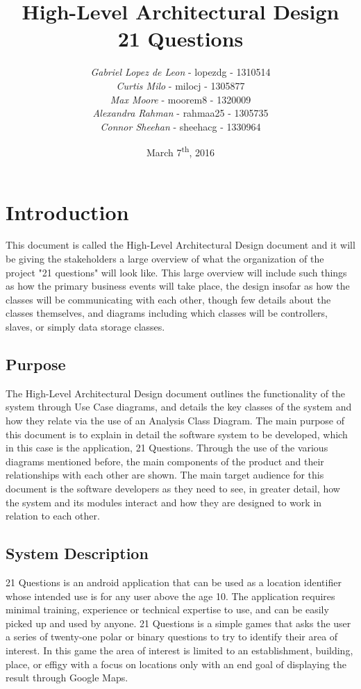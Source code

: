 \documentclass[titlepage]{article}
\title{\Huge{\textbf{High-Level Architectural Design\\21 Questions}}\vspace{9cm}}
\author{\textit{Gabriel Lopez de Leon} - lopezdg - 1310514\\\textit{Curtis Milo} - milocj - 1305877\\\textit{Max Moore} - moorem8 - 1320009\\\textit{Alexandra Rahman} - rahmaa25 - 1305735\\\textit{Connor Sheehan} - sheehacg - 1330964}
\date{March 7\textsuperscript{th}, 2016}
\begin{document}
\maketitle	

\tableofcontents
\newpage

\section{Introduction}
\label{sec:introduction}

This document is called the High-Level Architectural Design document and it will be giving the stakeholders a large overview of what the organization of the project "21 questions" will look like.  This large overview will include such things as how  the primary business events will take place, the design insofar as how the classes will be communicating with each other, though few details about the classes themselves, and diagrams including which classes will be controllers, slaves, or simply data storage classes.

\subsection{Purpose}
\label{sub:purpose}
The High-Level Architectural Design document outlines the functionality of the system through Use Case diagrams, and details the key classes of the system and how they relate via the use of an Analysis Class Diagram. The main purpose of this document is to explain in detail the software system to be developed, which in this case is the application, 21 Questions. Through the use of the various diagrams mentioned before, the main components of the product and their relationships with each other are shown. The main target audience for this document is the software developers as they need to see, in greater detail, how the system and its modules interact and how they are designed to work in relation to each other.

\subsection{System Description}
\label{sub:system_description}
21 Questions is an android application that can be used as a location identifier whose intended use is for any user above the age 10. The application requires minimal training, experience or technical expertise to use, and can be easily picked up and used by anyone. 21 Questions is a simple games that asks the user a series of twenty-one polar or binary questions to try to identify their area of interest. In this game the area of interest is limited to an establishment, building, place, or effigy with a focus on locations only with an end goal of displaying the result through Google Maps.
\end{document}
